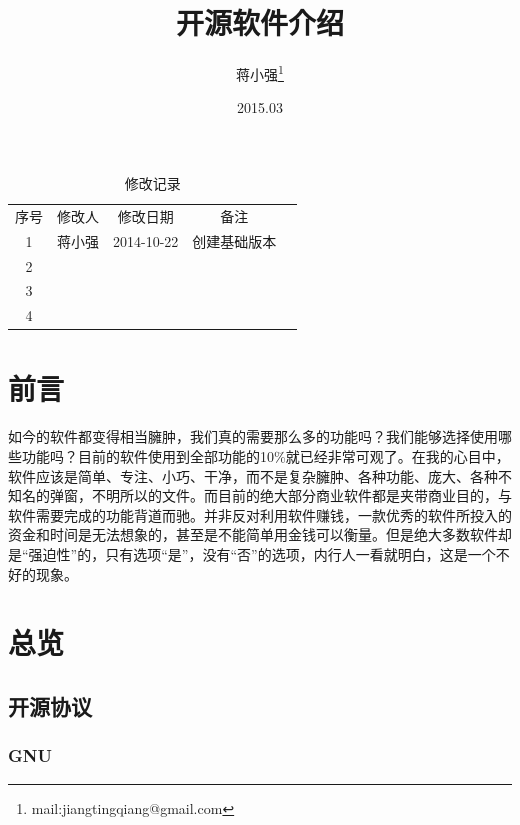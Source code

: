 \documentclass[paper=a4,fontsize=11pt]{article}
\begin{document}
	\title{开源软件介绍}		
	\author{蒋小强\footnote{mail:jiangtingqiang@gmail.com}}
	\date{2015.03}	
	
	\maketitle %
	\clearpage
	
	\begin{table}\caption{修改记录}					
		\medskip
		\centering		
		\begin{tabular}{|c|c|c|c|c|}
			\hline
			\multirow{1}{*}{序号}
			& \multicolumn{1}{|c|}{修改人}  
			& \multicolumn{1}{|c|}{修改日期} 
			& \multicolumn{1}{|c|}{备注}\\			
			\cline{1-4}
			1 & 蒋小强 & 2014-10-22 & 创建基础版本\\
			\hline
			2 & & &\\
			\hline
			3 & & &\\
			\hline
			4 & & &\\
			\hline
		\end{tabular}
	\end{table}
	\clearpage
	\section{前言}
	如今的软件都变得相当臃肿，我们真的需要那么多的功能吗？我们能够选择使用哪些功能吗？目前的软件使用到全部功能的10\%就已经非常可观了。在我的心目中，软件应该是简单、专注、小巧、干净，而不是复杂臃肿、各种功能、庞大、各种不知名的弹窗，不明所以的文件。而目前的绝大部分商业软件都是夹带商业目的，与软件需要完成的功能背道而驰。并非反对利用软件赚钱，一款优秀的软件所投入的资金和时间是无法想象的，甚至是不能简单用金钱可以衡量。但是绝大多数软件却是“强迫性”的，只有选项“是”，没有“否”的选项，内行人一看就明白，这是一个不好的现象。
	
	\newpage
	\section{总览}
	
	\subsection{开源协议}
	
	\subsubsection{GNU}
	
\end{document}
